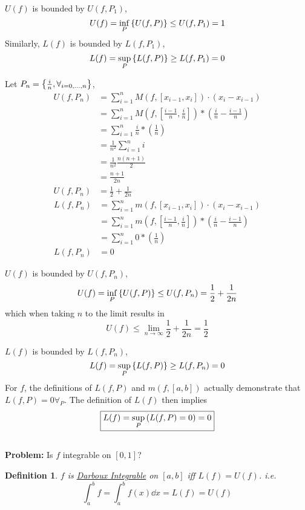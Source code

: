 \documentclass[]{article}
\newtheorem{definition}{Definition}
\begin{document}
$U(f)$ is bounded by $U(f,P_1)$,\[
    U(f) = \inf_{P}\qty{U(f,P)} \leq U(f, P_1) = 1
\]
Similarly, $L(f)$ is bounded by $L(f,P_1)$,\[
    L(f) = \sup_{P}\qty{L(f,P)} \geq L(f, P_1) = 0
\]

Let $P_n = \qty{\frac{i}{n}, \forall_{i = 0,\dots,n}}$,
\begin{align*}
    U(f,P_n) &= \sum_{i=1}^{n} M(f,[x_{i-1},x_i]) \cdot (x_i - x_{i-1})\\
        &= \sum_{i=1}^{n} M(f, [\frac{i-1}{n}, \frac{i}{n}]) * (\frac{i}{n} - \frac{i-1}{n})\\
        &= \sum_{i=1}^{n} \frac{i}{n} * (\frac{1}{n})\\
        &= \frac{1}{n^2} \sum_{i=1}^{n} i\\
        &= \frac{1}{n^2} \frac{n(n+1)}{2}\\
        &= \frac{n+1}{2n}\\
    U(f,P_n) &= \frac{1}{2} + \frac{1}{2n}
\end{align*}
\begin{align*}
    L(f,P_n) &= \sum_{i=1}^{n} m(f,[x_{i-1},x_i]) \cdot (x_i - x_{i-1})\\
        &= \sum_{i=1}^{n} m(f, [\frac{i-1}{n}, \frac{i}{n}]) * (\frac{i}{n} - \frac{i-1}{n})\\
        &= \sum_{i=1}^{n} 0 * (\frac{1}{n})\\
    L(f,P_n) &= 0
\end{align*}

$U(f)$ is bounded by $U(f,P_n)$,\[
    U(f) = \inf_{P} \qty{U(f,P)} \leq U(f,P_n) = \frac{1}{2} + \frac{1}{2n}
\] which when taking $n$ to the limit results in \[
    \boxed{U(f) \leq \lim_{n\to\infty} \frac{1}{2} + \frac{1}{2n} = \frac{1}{2}}
\]

$L(f)$ is bounded by $L(f,P_n)$,\[
    L(f) = \sup_{P} \qty{L(f,P)} \geq L(f,P_n) = 0
\]
For $f$, the definitions of $L(f,P)$ and $m(f, [a,b])$ actually demonstrate that $L(f,P) = 0 \forall_{P}$. 
The definition of $L(f)$ then implies\[
    \boxed{L(f) = \sup_{P} \qty(L(f,P) = 0) = 0}
\]

\subsection{}
\textbf{Problem:}
Is $f$ integrable on $[0,1]$?

\begin{definition}\label{def:darboux_integrable}
    $f$ is \emph{\underline{Darboux Integrable}} on $[a,b]$ iff $L(f) = U(f)$.
    i.e.\[
        \int_{a}^{b} f = \int_{a}^{b} f(x) \dd x = L(f) = U(f)
    \]
\end{definition}
\end{document}
